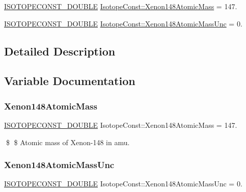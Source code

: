 \begin{DoxyCompactItemize}
\item 
\mbox{\hyperlink{group___isotope_const-_macros_ga8f45a7272ce02c0b4c65c44636ed719a}{I\+S\+O\+T\+O\+P\+E\+C\+O\+N\+S\+T\+\_\+\+D\+O\+U\+B\+LE}} \mbox{\hyperlink{group___isotope_const-_xenon-_xe148_ga64f4f96361951f2e83cab07a09755ee9}{Isotope\+Const\+::\+Xenon148\+Atomic\+Mass}} = 147.
\item 
\mbox{\hyperlink{group___isotope_const-_macros_ga8f45a7272ce02c0b4c65c44636ed719a}{I\+S\+O\+T\+O\+P\+E\+C\+O\+N\+S\+T\+\_\+\+D\+O\+U\+B\+LE}} \mbox{\hyperlink{group___isotope_const-_xenon-_xe148_ga45ffa1e288ff4d4c5f732192da78ab76}{Isotope\+Const\+::\+Xenon148\+Atomic\+Mass\+Unc}} = 0.
\end{DoxyCompactItemize}


\subsection{Detailed Description}


\subsection{Variable Documentation}
\mbox{\label{group___isotope_const-_xenon-_xe148_ga64f4f96361951f2e83cab07a09755ee9}} 
\subsubsection{\texorpdfstring{Xenon148\+Atomic\+Mass}{Xenon148AtomicMass}}
{\footnotesize\ttfamily \mbox{\hyperlink{group___isotope_const-_macros_ga8f45a7272ce02c0b4c65c44636ed719a}{I\+S\+O\+T\+O\+P\+E\+C\+O\+N\+S\+T\+\_\+\+D\+O\+U\+B\+LE}} Isotope\+Const\+::\+Xenon148\+Atomic\+Mass = 147.}

\$ \$ Atomic mass of Xenon-\/148 in amu. \mbox{\label{group___isotope_const-_xenon-_xe148_ga45ffa1e288ff4d4c5f732192da78ab76}} 
\subsubsection{\texorpdfstring{Xenon148\+Atomic\+Mass\+Unc}{Xenon148AtomicMassUnc}}
{\footnotesize\ttfamily \mbox{\hyperlink{group___isotope_const-_macros_ga8f45a7272ce02c0b4c65c44636ed719a}{I\+S\+O\+T\+O\+P\+E\+C\+O\+N\+S\+T\+\_\+\+D\+O\+U\+B\+LE}} Isotope\+Const\+::\+Xenon148\+Atomic\+Mass\+Unc = 0.}

